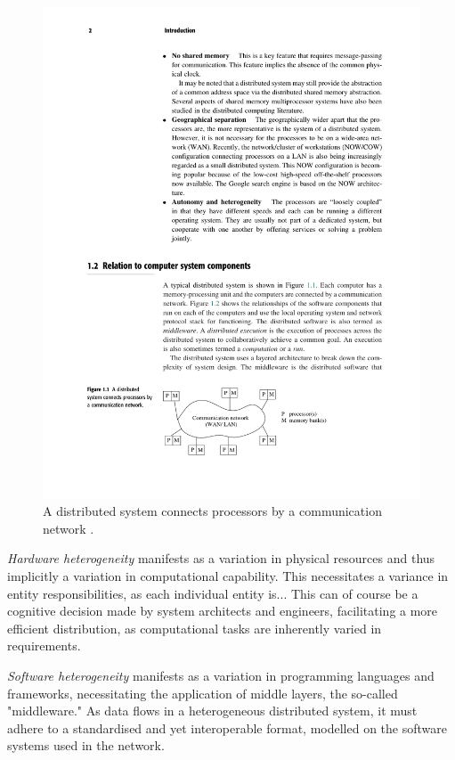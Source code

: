 \documentclass[../report.tex]{subfiles}
\begin{document}
\begin{figure}[h!]
\centering
\includegraphics[width=0.8\linewidth]{figures/networkcomms.pdf}
\caption{A distributed system connects processors by a communication network \cite[2]{kshemkalyani2011distributed}.}
\label{fig:networkcomms}
\end{figure}

\textit{Hardware heterogeneity} manifests as a variation in physical resources and thus implicitly a variation in computational capability. This necessitates a variance in entity responsibilities, as each individual entity is... This can of course be a cognitive decision made by system architects and engineers, facilitating a more efficient distribution, as computational tasks are inherently varied in requirements.

\textit{Software heterogeneity} manifests as a variation in programming languages and frameworks, necessitating the application of middle layers, the so-called "middleware." As data flows in a heterogeneous distributed system, it must adhere to a standardised and yet interoperable format, modelled on the software systems used in the network.
\end{document}
